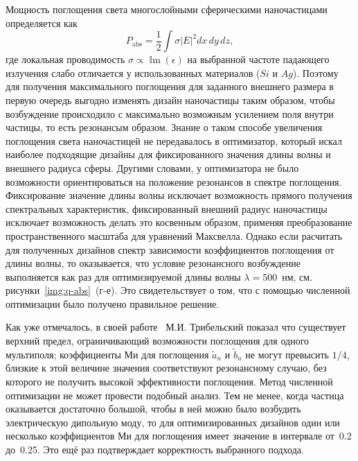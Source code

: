 Мощность поглощения света многослойными сферическими наночастицами
определяется как
\[
  P_{\mathrm {abs}}=\frac{1}{2}\int\sigma \left|E\right|^2dx\,dy\,dz,
\]
где локальная проводимость
$\sigma\propto \operatorname{\mathbb{I}m} (\epsilon)$ на выбранной
частоте падающего излучения слабо отличается у использованных
материалов ($Si$ и $Ag$).  Поэтому для получения максимального
поглощения для заданного внешнего размера в первую очередь выгодно
изменять дизайн наночастицы таким образом, чтобы возбуждение
происходило с максимально возможным усилением поля внутри частицы, то
есть резонансым образом.  Знание о таком способе увеличения поглощения
света наночастицей не передавалось в оптимизатор, который искал
наиболее подходящие дизайны для фиксированного значения длины волны и
внешнего радиуса сферы.  Другими словами, у оптимизатора не было
возможности ориентироваться на положение резонансов в спектре
поглощения. Фиксирование значение длины волны исключает возможность
прямого получения спектральных характеристик, фиксированный внешний
радиус наночастицы исключает возможность делать это косвенным образом,
применяя преобразование пространственного масштаба для уравнений
Максвелла. Однако если расчитать для полученных дизайнов спектр
зависимости коэффициентов поглощения от длины волны, то оказывается,
что условие резонансного возбуждение выполняется как раз для
оптимизируемой длины волны $\lambda=500$~нм,
см. рисунки~\ref{img:q-abs}~(г-е).  Это свидетельствует о том, что с
помощью численной оптимизации было получено правильное решение.

Как уже отмечалось, в своей работе~\cite{Tribelsky-2011}
М.И. Трибельский показал что существует верхний предел, ограничивающий
возможности поглощения для одного мультиполя; коэффициенты Ми для
поглощения $\tilde{a}_n$ и $\tilde{b}_n$ не могут превысить $1/4$,
близкие к этой величине значения соответствуют резонансному случаю,
без которого не получить высокой эффективности поглощения.  Метод
численной оптимизации не может провести подобный анализ.  Тем не
менее, когда частица оказывается достаточно большой, чтобы в ней можно
было возбудить электрическую дипольную моду, то для оптимизированных
дизайнов один или несколько коэффициентов Ми для поглощения имеет
значение в интервале от~0.2 до~0.25.  Это ещё  раз подтверждает
корректность выбранного подхода.

